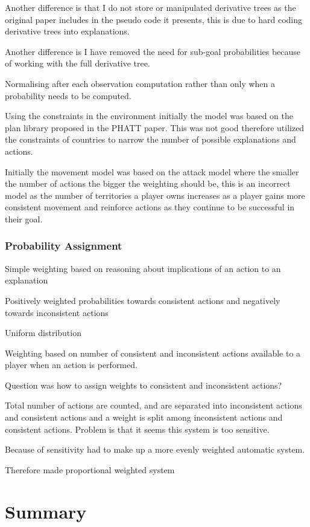 \documentclass[parskip]{cs4rep}
\begin{document}
Another difference is that I do not store or manipulated derivative trees as the original paper includes in the pseudo code it presents, this is due to hard coding derivative trees into explanations.

Another difference is I have removed the need for sub-goal probabilities because of working with the full derivative tree.

Normalising after each observation computation rather than only when a probability needs to be computed.

Using the constraints in the environment initially the model was based on the plan library proposed in the PHATT paper. This was not good therefore utilized the constraints of countries to narrow the number of possible explanations and actions.

Initially the movement model was based on the attack model where the smaller the number of actions the bigger the weighting should be, this is an incorrect model as the number of territories a player owns increases as a player gains more consistent movement and reinforce actions as they continue to be successful in their goal.

\subsubsection{Probability Assignment}

Simple weighting based on reasoning about implications of an action to an explanation

Positively weighted probabilities towards consistent actions and negatively towards inconsistent actions

Uniform distribution

Weighting based on number of consistent and inconsistent actions available to a player when an action is performed.

Question was how to assign weights to consistent and inconsistent actions?

Total number of actions are counted, and are separated into inconsistent actions and consistent actions and a weight is split among inconsistent actions and consistent actions. Problem is that it seems this system is too sensitive.

Because of sensitivity had to make up a more evenly weighted automatic system.

Therefore made proportional weighted system

\section{Summary}
\end{document}

